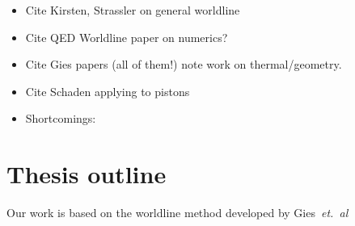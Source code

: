 \begin{itemize}
\item Cite Kirsten, Strassler on general worldline
\item Cite QED Worldline paper on numerics?
\item Cite Gies papers (all of them!) note work on thermal/geometry.
\item Cite Schaden applying to pistons
\item Shortcomings: 
\end{itemize}

\section{Thesis outline}


Our work is based on the worldline method developed by Gies~\textit{et.~al}\cite{Gies2003}


